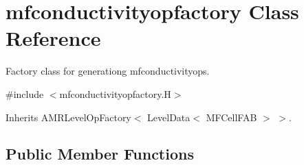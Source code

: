 \hypertarget{classmfconductivityopfactory}{}\section{mfconductivityopfactory Class Reference}
\label{classmfconductivityopfactory}


Factory class for generationg mfconductivityop\textquotesingle{}s.  




{\ttfamily \#include $<$mfconductivityopfactory.\+H$>$}



Inherits A\+M\+R\+Level\+Op\+Factory$<$ Level\+Data$<$ M\+F\+Cell\+F\+A\+B $>$ $>$.

\subsection*{Public Member Functions}
